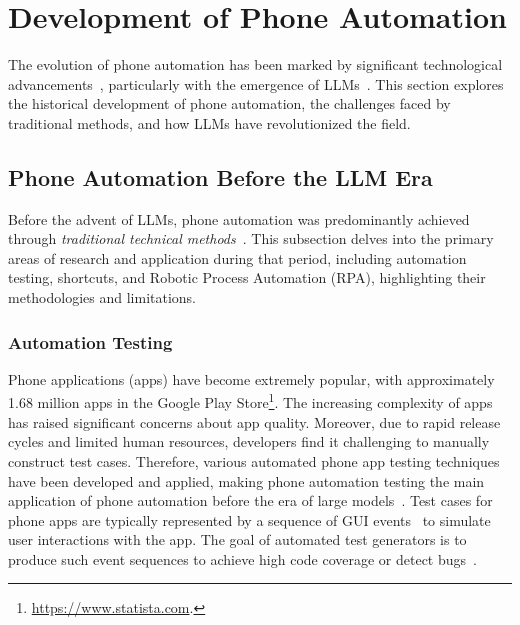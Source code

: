 \section{Development of Phone Automation}
\label{sec:development}

The evolution of phone automation has been marked by significant technological advancements~\cite{kong2018automated}, particularly with the emergence of LLMs~\cite{radford2018gpt1,radford2019gpt2,brown2020gpt3,achiam2023gpt}. This section explores the historical development of phone automation, the challenges faced by traditional methods, and how LLMs have revolutionized the field.

\subsection{Phone Automation Before the LLM Era}
Before the advent of LLMs, phone automation was predominantly achieved through \textit{traditional technical methods}~\cite{kirubakaran2013mobile,azim2013targeted,amalfitano2014mobiguitar,linares2017continuous,kong2018automated,zhao2024dinodroid}. This subsection delves into the primary areas of research and application during that period, including automation testing, shortcuts, and Robotic Process Automation (RPA), highlighting their methodologies and limitations.

\subsubsection{Automation Testing}

Phone applications (apps) have become extremely popular, with approximately 1.68 million apps in the Google Play Store\footnote{\href{https://www.statista.com}{https://www.statista.com}.}. The increasing complexity of apps~\cite{hecht2015tracking} has raised significant concerns about app quality. Moreover, due to rapid release cycles and limited human resources, developers find it challenging to manually construct test cases. Therefore, various automated phone app testing techniques have been developed and applied, making phone automation testing the main application of phone automation before the era of large models~\cite{kirubakaran2013mobile,kong2018automated,linares2017continuous,zein2016systematic}. Test cases for phone apps are typically represented by a sequence of GUI events~\cite{jensen2013automated} to simulate user interactions with the app. The goal of automated test generators is to produce such event sequences to achieve high code coverage or detect bugs~\cite{zhao2024dinodroid}.

